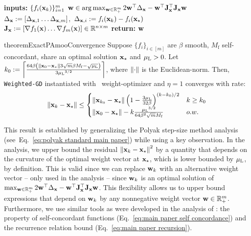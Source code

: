 \begin{algorithm}[t]
 \caption{\PAMOO}
 \label{alg:PAMOO}    
\begin{algorithmic}[1]
 \STATE \textbf{inputs:} $\{ f_i({\mathbf{x}}_k) \}_{i=1}^m$
 \STATE ${\mathbf{w}}\in \arg\max_{{\mathbf{w}}\in \mathbb{R}^m_+} 2{\mathbf{w}}^\top \Delta_{\mathbf{x}} - {\mathbf{w}}^\top {\mathbf{J}}_{\mathbf{x}}^\top{\mathbf{J}}_{\mathbf{x}} {\mathbf{w}}$ \label{eq:pamoo optimization main paper}
 \STATE $\Delta_{{\mathbf{x}}} := \left[  \Delta_{{\mathbf{x}},1}\dots \Delta_{{\mathbf{x}},m} \right]$,\  $\Delta_{{\mathbf{x}},i}:=f_{i}({\mathbf{x}}_k)-f_{i}({\mathbf{x}}_\star)$
  \STATE ${\mathbf{J}}_{\mathbf{x}} := \left[ \nabla f_1({\mathbf{x}}) \dots \nabla f_m({\mathbf{x}})  \right] \in \mathbb{R}^{n \times m}$
 \STATE \textbf{return:} ${\mathbf{w}}$
\end{algorithmic}
\end{algorithm}


\begin{restatable}{theorem}{ExactPAmooConvergence}
\label{thm:exact_pamoo_convergence}
    Suppose $\{f_i\}_{i\in [m]}$ are $\beta$ smooth, $M_{\mathrm{f}}$ self-concordant, share an optimal solution ${\mathbf{x}}_\star$ and ${\mu_{\mathrm{L}}} > 0$. Let $k_0 := \left\lceil \frac{64 \beta  \left(\left\Vert{\mathbf{x}}_0 - {\mathbf{x}}_\star\right\Vert 3\sqrt{m}\beta M_{\mathrm{f}} -\sqrt{{\mu_{\mathrm{L}}}}\right) }{ 3{\mu_{\mathrm{L}}}^{3/2}}\right\rceil$, where $\left\Vert\cdot\right\Vert$ is the Euclidean-norm. Then, \texttt{Weighted-GD} instantiated with \PAMOO\ weight-optimizer and $\eta = 1$  converges with rate:
    \begin{align*}
            \left\Vert{\mathbf{x}}_{k} - {\mathbf{x}}_\star\right\Vert \leq 
        \begin{cases}
            \left\Vert{\mathbf{x}}_{k_0} - {\mathbf{x}}_\star\right\Vert \left(1-\frac{3{\mu_{\mathrm{L}}}}{32\beta}\right)^{(k-k_0)/2}  & k\geq k_0\\
            \left\Vert{\mathbf{x}}_0 - {\mathbf{x}}_\star\right\Vert- k \frac{{\mu_{\mathrm{L}}}^{3/2}}{64 \beta^2 \sqrt{m} M_{\mathrm{f}}} & o.w.
        \end{cases}
    \end{align*}
\end{restatable}


This result is established by generalizing the Polyak step-size method analysis (see~Eq.~\eqref{eq:polyak standard main paper}) while using a key observation. In the analysis, we upper bound the residual $\left\Vert{\mathbf{x}}_k-{\mathbf{x}}_\star\right\Vert^2$ by a quantity that depends on the curvature of the optimal weight vector at ${\mathbf{x}}_\star$, which is lower bounded by ${\mu_{\mathrm{L}}}$, by definition. This is valid since we can replace ${\mathbf{w}}_k$ with an alternative weight vector -- only used in the analysis -- since ${\mathbf{w}}_k$ is an optimal solution of $\max_{{\mathbf{w}}\in \mathbb{R}^m_+} 2{\mathbf{w}}^\top \Delta_{\mathbf{x}} - {\mathbf{w}}^\top {\mathbf{J}}_{\mathbf{x}}^\top{\mathbf{J}}_{\mathbf{x}} {\mathbf{w}}$. This flexibility allows us to upper bound expressions that depend on ${\mathbf{w}}_k$ by any nonnegative weight vector ${\mathbf{w}}\in \mathbb{R}^m_{+}$. Furthermore, we use similar tools as were developed in the analysis of \CAMOO: the property of self-concordant functions (Eq.~\eqref{eq:main paper self concordance}) and the recurrence relation bound (Eq.~\eqref{eq:main paper recursion}). 

